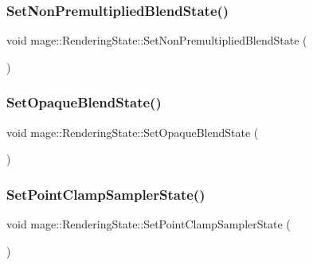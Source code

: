 \hypertarget{structmage_1_1_rendering_state_acf313a797964e3a86dde2799a42f2db3}{}\label{structmage_1_1_rendering_state_acf313a797964e3a86dde2799a42f2db3} 
\subsubsection{\texorpdfstring{Set\+Non\+Premultiplied\+Blend\+State()}{SetNonPremultipliedBlendState()}}
{\footnotesize\ttfamily void mage\+::\+Rendering\+State\+::\+Set\+Non\+Premultiplied\+Blend\+State (\begin{DoxyParamCaption}{ }\end{DoxyParamCaption})}

\hypertarget{structmage_1_1_rendering_state_ab0f578405f3c880234757e152be1a670}{}\label{structmage_1_1_rendering_state_ab0f578405f3c880234757e152be1a670} 
\subsubsection{\texorpdfstring{Set\+Opaque\+Blend\+State()}{SetOpaqueBlendState()}}
{\footnotesize\ttfamily void mage\+::\+Rendering\+State\+::\+Set\+Opaque\+Blend\+State (\begin{DoxyParamCaption}{ }\end{DoxyParamCaption})}

\hypertarget{structmage_1_1_rendering_state_aabf9e70b12cb12560e6c6c880bbc08ca}{}\label{structmage_1_1_rendering_state_aabf9e70b12cb12560e6c6c880bbc08ca} 
\subsubsection{\texorpdfstring{Set\+Point\+Clamp\+Sampler\+State()}{SetPointClampSamplerState()}}
{\footnotesize\ttfamily void mage\+::\+Rendering\+State\+::\+Set\+Point\+Clamp\+Sampler\+State (\begin{DoxyParamCaption}{ }\end{DoxyParamCaption})}

